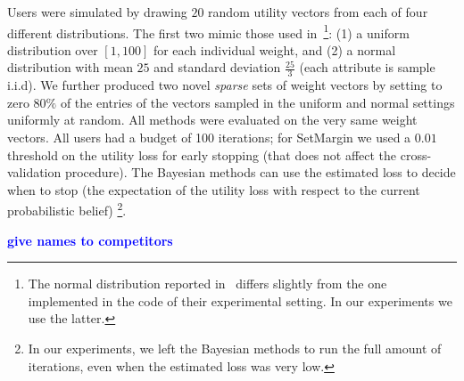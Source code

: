 \documentclass{article}
\renewcommand\[{\begin{equation}}
\renewcommand\]{\end{equation}}
\newcommand{\andrea}[1]{{\bf \textcolor{blue}{{\fbox{Andrea:} #1}}}}
\begin{document}
Users were simulated by drawing $20$ random utility vectors from each of four
different distributions. The first two mimic those used
in~\cite{guo2010real}\footnote{The normal distribution reported
in~\cite{guo2010real} differs slightly from the one implemented in the code of
their experimental setting. 
In our experiments we use the latter.}:
(1) a uniform distribution over $[1, 100]$ for each individual weight, and (2)
a normal distribution with mean $25$ and %
standard deviation $\frac{25}{3}$ (each attribute is sample i.i.d).  
We further produced two novel
{\em sparse} sets of weight vectors by setting to zero $80\%$ of the entries of the
vectors sampled in the uniform and normal settings uniformly at random. 
All methods were evaluated on the very same weight vectors. All users had
a budget of 100 iterations; for {\sc SetMargin} we used a $0.01$
threshold on the utility loss for early stopping (that does not affect the
cross-validation procedure).
The Bayesian methods can use the estimated loss to decide when to stop (the expectation
of the utility loss with respect to the current probabilistic belief)
\footnote{In our experiments, we left the Bayesian methods to run the full amount of iterations,
even when the estimated loss was very low.}.

\andrea{give names to competitors}

\end{document}
